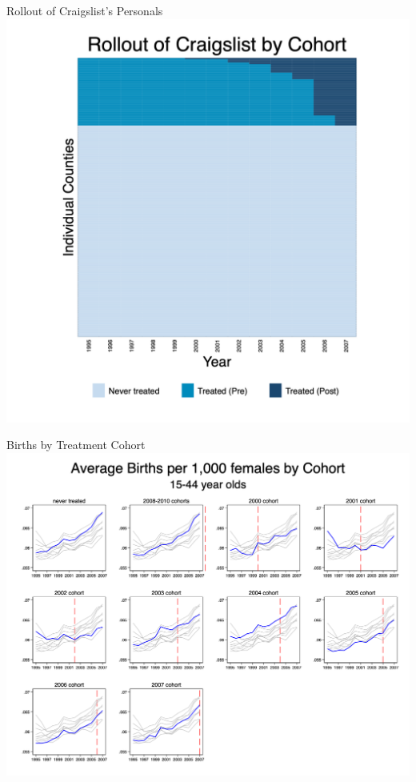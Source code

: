 \documentclass{beamer}
\begin{document}
\begin{frame}{Rollout of Craigslist's Personals}
    \centering
    \includegraphics[width=\textwidth,height=0.95\textheight,keepaspectratio]{./lecture_includes/rollout.png}
\end{frame}

\begin{frame}{Births by Treatment Cohort}
    \includegraphics[width=\textwidth,height=0.9\textheight,keepaspectratio]{./lecture_includes/pretty_births.png}
\end{frame}
\end{document}
